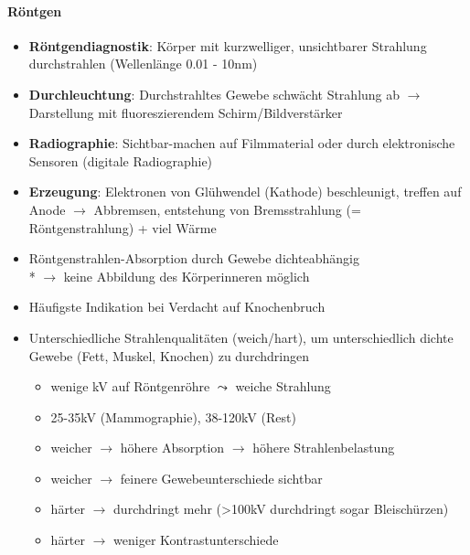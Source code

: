 \paragraph{Röntgen}
\begin{itemize}
  \item \textbf{Röntgendiagnostik}: Körper mit kurzwelliger, unsichtbarer Strahlung durchstrahlen (Wellenlänge 0.01 - 10nm)
  \item \textbf{Durchleuchtung}: Durchstrahltes Gewebe schwächt Strahlung ab \( \to \) Darstellung mit fluoreszierendem Schirm/Bildverstärker
  \item \textbf{Radiographie}: Sichtbar-machen auf Filmmaterial oder durch elektronische Sensoren (digitale Radiographie)
  \item \textbf{Erzeugung}: Elektronen von Glühwendel (Kathode) beschleunigt, treffen auf Anode \( \to \) Abbremsen, entstehung von Bremsstrahlung (= Röntgenstrahlung) + viel Wärme
  \item Röntgenstrahlen-Absorption durch Gewebe dichteabhängig \\* \( \to \) keine Abbildung des Körperinneren möglich
  \item Häufigste Indikation bei Verdacht auf Knochenbruch
  \item Unterschiedliche Strahlenqualitäten (weich/hart), um unterschiedlich dichte Gewebe (Fett, Muskel, Knochen) zu durchdringen
  \begin{itemize}
    \item wenige kV auf Röntgenröhre \( \leadsto \) weiche Strahlung
    \item 25-35kV (Mammographie), 38-120kV (Rest)
    \item weicher \( \to \) höhere Absorption \( \to \) höhere Strahlenbelastung
    \item weicher \( \to \) feinere Gewebeunterschiede sichtbar
    \item härter \( \to \) durchdringt mehr (>100kV durchdringt sogar Bleischürzen)
    \item härter \( \to \) weniger Kontrastunterschiede
  \end{itemize}
\end{itemize}

